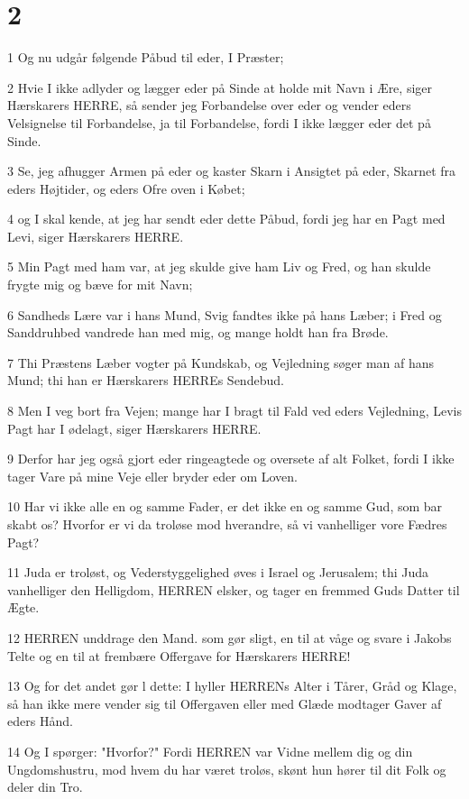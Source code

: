 \chapter{2}

\par 1 Og nu udgår følgende Påbud til eder, I Præster;
\par 2 Hvie I ikke adlyder og lægger eder på Sinde at holde mit Navn i Ære, siger Hærskarers HERRE, så sender jeg Forbandelse over eder og vender eders Velsignelse til Forbandelse, ja til Forbandelse, fordi I ikke lægger eder det på Sinde.
\par 3 Se, jeg afhugger Armen på eder og kaster Skarn i Ansigtet på eder, Skarnet fra eders Højtider, og eders Ofre oven i Købet;
\par 4 og I skal kende, at jeg har sendt eder dette Påbud, fordi jeg har en Pagt med Levi, siger Hærskarers HERRE.
\par 5 Min Pagt med ham var, at jeg skulde give ham Liv og Fred, og han skulde frygte mig og bæve for mit Navn;
\par 6 Sandheds Lære var i hans Mund, Svig fandtes ikke på hans Læber; i Fred og Sanddruhbed vandrede han med mig, og mange holdt han fra Brøde.
\par 7 Thi Præstens Læber vogter på Kundskab, og Vejledning søger man af hans Mund; thi han er Hærskarers HERREs Sendebud.
\par 8 Men I veg bort fra Vejen; mange har I bragt til Fald ved eders Vejledning, Levis Pagt har I ødelagt, siger Hærskarers HERRE.
\par 9 Derfor har jeg også gjort eder ringeagtede og oversete af alt Folket, fordi I ikke tager Vare på mine Veje eller bryder eder om Loven.
\par 10 Har vi ikke alle en og samme Fader, er det ikke en og samme Gud, som bar skabt os? Hvorfor er vi da troløse mod hverandre, så vi vanhelliger vore Fædres Pagt?
\par 11 Juda er troløst, og Vederstyggelighed øves i Israel og Jerusalem; thi Juda vanhelliger den Helligdom, HERREN elsker, og tager en fremmed Guds Datter til Ægte.
\par 12 HERREN unddrage den Mand. som gør sligt, en til at våge og svare i Jakobs Telte og en til at frembære Offergave for Hærskarers HERRE!
\par 13 Og for det andet gør l dette: I hyller HERRENs Alter i Tårer, Gråd og Klage, så han ikke mere vender sig til Offergaven eller med Glæde modtager Gaver af eders Hånd.
\par 14 Og I spørger: "Hvorfor?" Fordi HERREN var Vidne mellem dig og din Ungdomshustru, mod hvem du har været troløs, skønt hun hører til dit Folk og deler din Tro.

